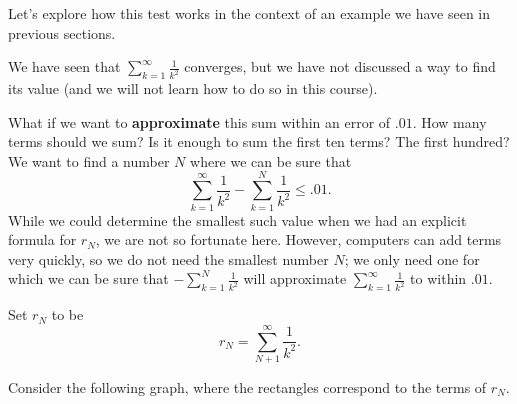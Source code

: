 \documentclass{ximera}
\begin{document}
Let's explore how this test works in the context of an example we have seen in previous sections.

\begin{model}
We have seen that  $\sum_{k=1}^\infty \frac{1}{k^2}$ converges, but we have not discussed a way to find its value (and
we will not learn how to do so in this course). 

What if we want to \textbf{approximate} this sum within an error of
$.01$.  How many terms should we sum?  Is it enough to sum
the first ten terms?  The first hundred?  We want to find a number $N$
where we can be sure that
\[
\sum_{k=1}^\infty \frac{1}{k^2}-\sum_{k=1}^N \frac{1}{k^2} \leq .01.
\]
While we could determine the smallest such value when we had an explicit formula for $r_N$, we are not so fortunate here.  However, computers can add terms very quickly, so we do not need the smallest number $N$; we only need one for which we can be sure that $-\sum_{k=1}^N \frac{1}{k^2}$ will approximate $\sum_{k=1}^\infty \frac{1}{k^2}$ to within $.01$.  

Set $r_N$ to be 
\[
r_N = \sum_{N+1}^\infty \frac{1}{k^2}.
\]

Consider the following graph, where the rectangles correspond to the terms of $r_N$.
\begin{image}
\end{image}
\end{model}
\end{document}
